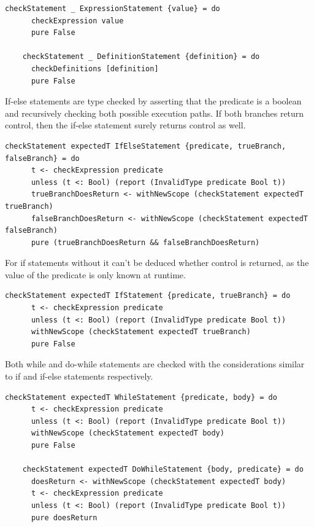 \documentclass[UdineBachThesis,american,11pt]{PhdThesis}
\begin{document}
  \begin{lstlisting}[gobble=4,basicstyle=\ttfamily\small]
    checkStatement _ ExpressionStatement {value} = do
      checkExpression value
      pure False

    checkStatement _ DefinitionStatement {definition} = do
      checkDefinitions [definition]
      pure False
  \end{lstlisting}

  If-else statements are type checked by asserting that the predicate is a
  boolean and recursively checking both possible execution paths. If both
  branches return control, then the if-else statement surely returns control as
  well.

  \begin{lstlisting}[gobble=4,basicstyle=\ttfamily\small]
    checkStatement expectedT IfElseStatement {predicate, trueBranch, falseBranch} = do
      t <- checkExpression predicate
      unless (t <: Bool) (report (InvalidType predicate Bool t))
      trueBranchDoesReturn <- withNewScope (checkStatement expectedT trueBranch)
      falseBranchDoesReturn <- withNewScope (checkStatement expectedT falseBranch)
      pure (trueBranchDoesReturn && falseBranchDoesReturn)
  \end{lstlisting}

  For if statements without \lstinline@else@ it can't be deduced whether control
  is returned, as the value of the predicate is only known at runtime.

  \begin{lstlisting}[gobble=4,basicstyle=\ttfamily\small]
    checkStatement expectedT IfStatement {predicate, trueBranch} = do
      t <- checkExpression predicate
      unless (t <: Bool) (report (InvalidType predicate Bool t))
      withNewScope (checkStatement expectedT trueBranch)
      pure False
  \end{lstlisting}

  Both while and do-while statements are checked with the considerations similar
  to if and if-else statements respectively.

  \begin{lstlisting}[gobble=4,basicstyle=\ttfamily\small]
    checkStatement expectedT WhileStatement {predicate, body} = do
      t <- checkExpression predicate
      unless (t <: Bool) (report (InvalidType predicate Bool t))
      withNewScope (checkStatement expectedT body)
      pure False

    checkStatement expectedT DoWhileStatement {body, predicate} = do
      doesReturn <- withNewScope (checkStatement expectedT body)
      t <- checkExpression predicate
      unless (t <: Bool) (report (InvalidType predicate Bool t))
      pure doesReturn
  \end{lstlisting}
\end{document}
